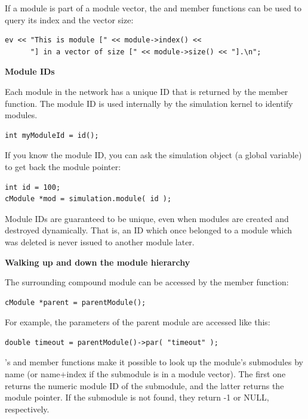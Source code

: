 If a module is part of a module vector, the
 and  member functions can be used to
query its index and the vector size:

\begin{Verbatim}
ev << "This is module [" << module->index() << 
      "] in a vector of size [" << module->size() << "].\n";
\end{Verbatim}


\textbf{Module IDs}


Each module in the network has a unique ID that is returned by the
 member function. The module ID is used
internally by the simulation kernel to identify modules.

\begin{Verbatim}
int myModuleId = id();
\end{Verbatim}

If you know the module ID, you can ask the simulation object 
(a global variable) to get back the module pointer:

\begin{Verbatim}
int id = 100;
cModule *mod = simulation.module( id );
\end{Verbatim}


Module IDs are guaranteed to be unique, even when modules are 
created and destroyed dynamically. That is, an ID which once 
belonged to a module which was deleted is never issued to another 
module later.


\textbf{Walking up and down the module hierarchy}


The surrounding compound module can be accessed by the
 member function:

\begin{Verbatim}
cModule *parent = parentModule();
\end{Verbatim}

For example, the parameters of the parent module are accessed 
like this:

\begin{Verbatim}
double timeout = parentModule()->par( "timeout" );
\end{Verbatim}


's  and 
member functions make it possible to look up the module's submodules
by name (or name+index if the submodule
is in a module vector). The first one returns the numeric module ID of
the submodule, and the latter returns the module pointer.  If the
submodule is not found, they return -1 or NULL, respectively.

